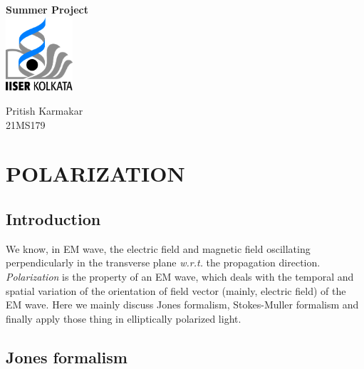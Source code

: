 \documentclass[11pt,a4paper]{article}
\author{Pritish Karmakar}
\numberwithin{equation}{section}
\begin{document}
	\begin{titlepage}
		\vspace*{3.5cm}
		\centering
		{\Huge\bfseries Summer Project}\\
		\vspace{5cm}
		\includegraphics[width=2.5cm]{iiserk.png}

		\vspace{5cm}
		
		{\LARGE Pritish Karmakar\\}
		\vspace{0.3cm}
		{21MS179}
		\vfill
		
		
		\clearpage
		\tableofcontents
		\clearpage
		\listoffigures
		\listoftables
		\lstlistoflistings
		
	\end{titlepage}


\section{POLARIZATION}
\subsection{Introduction}
We know, in EM wave, the electric field and magnetic field oscillating perpendicularly in the transverse plane \textit{w.r.t.} the propagation direction. \textit{Polarization} is the property of an EM wave, which deals with the temporal and spatial variation of the orientation of field vector (mainly,  electric field) of the EM wave. Here we mainly discuss Jones formalism, Stokes-Muller formalism and finally apply those thing in elliptically polarized light.

\subsection{Jones formalism}
\end{document}
